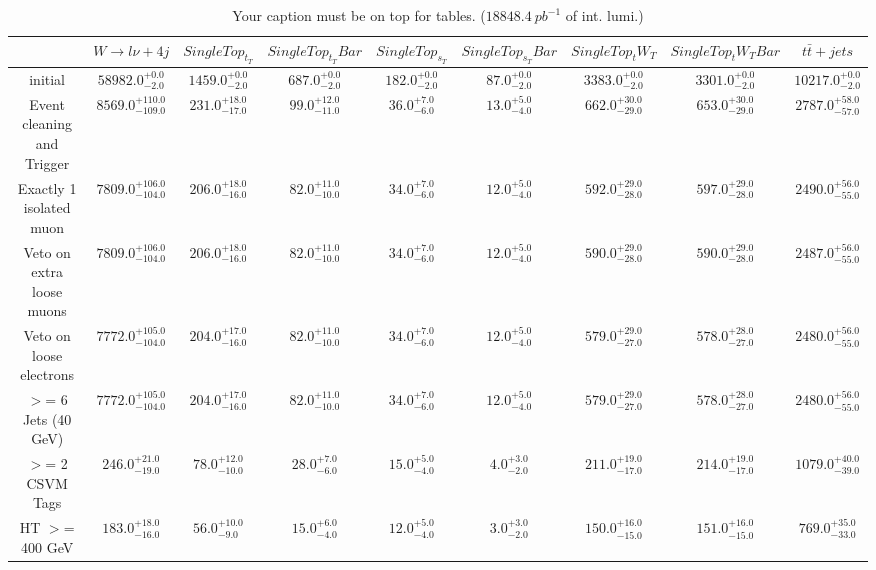 \documentclass{article}
\begin{document}
\begin{table}
\caption{Your caption must be on top for tables. ($18848.4~pb^{-1}$ of int. lumi.)}
\label{tab:}
\centering
\begin{tabular}{|c|cccccccc|}
\toprule
&$W\rightarrow l\nu + 4j$	&$SingleTop_t_T$	&$SingleTop_t_TBar$	&$SingleTop_s_T$	&$SingleTop_s_TBar$	&$SingleTop_tW_T$	&$SingleTop_tW_TBar$	&$t\bar{t}+jets$	\\

\midrule
initial&	$58982.0^{+0.0}_{-2.0}$	&$1459.0^{+0.0}_{-2.0}$	&$687.0^{+0.0}_{-2.0}$	&$182.0^{+0.0}_{-2.0}$	&$87.0^{+0.0}_{-2.0}$	&$3383.0^{+0.0}_{-2.0}$	&$3301.0^{+0.0}_{-2.0}$	&$10217.0^{+0.0}_{-2.0}$	\\

Event cleaning and Trigger&	$8569.0^{+110.0}_{-109.0}$	&$231.0^{+18.0}_{-17.0}$	&$99.0^{+12.0}_{-11.0}$	&$36.0^{+7.0}_{-6.0}$	&$13.0^{+5.0}_{-4.0}$	&$662.0^{+30.0}_{-29.0}$	&$653.0^{+30.0}_{-29.0}$	&$2787.0^{+58.0}_{-57.0}$	\\

Exactly 1 isolated muon&	$7809.0^{+106.0}_{-104.0}$	&$206.0^{+18.0}_{-16.0}$	&$82.0^{+11.0}_{-10.0}$	&$34.0^{+7.0}_{-6.0}$	&$12.0^{+5.0}_{-4.0}$	&$592.0^{+29.0}_{-28.0}$	&$597.0^{+29.0}_{-28.0}$	&$2490.0^{+56.0}_{-55.0}$	\\

Veto on extra loose muons&	$7809.0^{+106.0}_{-104.0}$	&$206.0^{+18.0}_{-16.0}$	&$82.0^{+11.0}_{-10.0}$	&$34.0^{+7.0}_{-6.0}$	&$12.0^{+5.0}_{-4.0}$	&$590.0^{+29.0}_{-28.0}$	&$590.0^{+29.0}_{-28.0}$	&$2487.0^{+56.0}_{-55.0}$	\\

Veto on loose electrons&	$7772.0^{+105.0}_{-104.0}$	&$204.0^{+17.0}_{-16.0}$	&$82.0^{+11.0}_{-10.0}$	&$34.0^{+7.0}_{-6.0}$	&$12.0^{+5.0}_{-4.0}$	&$579.0^{+29.0}_{-27.0}$	&$578.0^{+28.0}_{-27.0}$	&$2480.0^{+56.0}_{-55.0}$	\\

$>$= 6 Jets (40 GeV)&	$7772.0^{+105.0}_{-104.0}$	&$204.0^{+17.0}_{-16.0}$	&$82.0^{+11.0}_{-10.0}$	&$34.0^{+7.0}_{-6.0}$	&$12.0^{+5.0}_{-4.0}$	&$579.0^{+29.0}_{-27.0}$	&$578.0^{+28.0}_{-27.0}$	&$2480.0^{+56.0}_{-55.0}$	\\

$>$= 2 CSVM Tags&	$246.0^{+21.0}_{-19.0}$	&$78.0^{+12.0}_{-10.0}$	&$28.0^{+7.0}_{-6.0}$	&$15.0^{+5.0}_{-4.0}$	&$4.0^{+3.0}_{-2.0}$	&$211.0^{+19.0}_{-17.0}$	&$214.0^{+19.0}_{-17.0}$	&$1079.0^{+40.0}_{-39.0}$	\\

HT $>$=  400 GeV&	$183.0^{+18.0}_{-16.0}$	&$56.0^{+10.0}_{-9.0}$	&$15.0^{+6.0}_{-4.0}$	&$12.0^{+5.0}_{-4.0}$	&$3.0^{+3.0}_{-2.0}$	&$150.0^{+16.0}_{-15.0}$	&$151.0^{+16.0}_{-15.0}$	&$769.0^{+35.0}_{-33.0}$	\\

\bottomrule
\end{tabular}
\end{table}
\end{document}
